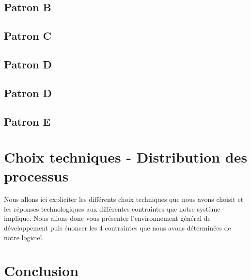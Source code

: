 \subsection{Patron B}

\subsection{Patron C}

\subsection{Patron D}

\subsection{Patron D}

\subsection{Patron E}


\section{Choix techniques - Distribution des processus}

\indent Nous allons ici expliciter les différents choix techniques que nous avons choisit et les réponses technologiques aux différentes contraintes que notre système implique. Nous allons donc vous présenter l'environnement général de développement puis énoncer les 4 contraintes que nous avons déterminées de notre logiciel.

%
%



\section{Conclusion}

